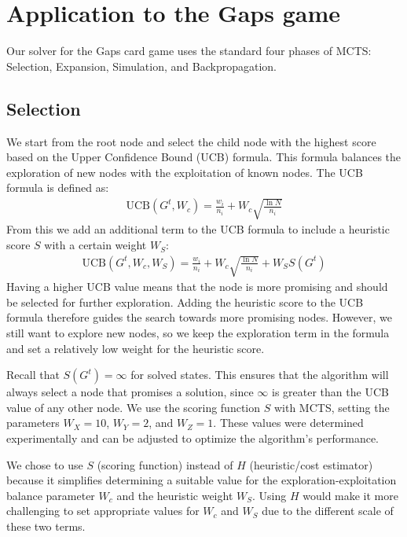 
\section{Application to the Gaps game}
Our solver for the Gaps card game uses the standard four phases of MCTS: Selection, Expansion, Simulation, and Backpropagation.

\subsection{Selection}
We start from the root node and select the child node with the highest score based on the Upper Confidence Bound (UCB) formula. This formula balances the exploration of new nodes with the exploitation of known nodes. The UCB formula is defined as:
\begin{align*}
    \text{UCB}(G^t, W_c) = \frac{w_i}{n_i} + W_c \sqrt{\frac{\ln{N}}{n_i}}
\end{align*}
From this we add an additional term to the UCB formula to include a heuristic score $S$ with a certain weight $W_S$:
\begin{align*}
    \text{UCB}(G^t, W_c, W_S) = \frac{w_i}{n_i} + W_c \sqrt{\frac{\ln{N}}{n_i}} + W_SS(G^t)
\end{align*}
Having a higher UCB value means that the node is more promising and should be selected for further exploration. Adding the heuristic score to the UCB formula therefore guides the search towards more promising nodes. However, we still want to explore new nodes, so we keep the exploration term in the formula and set a relatively low weight for the heuristic score.

 Recall that $S(G^t) = \infty$ for solved states. This ensures that the algorithm will always select a node that promises a solution, since $\infty$ is greater than the UCB value of any other node. We use the scoring function $S$ with MCTS, setting the parameters $W_X = 10$, $W_Y = 2$, and $W_Z = 1$. These values were determined experimentally and can be adjusted to optimize the algorithm's performance.
 
 We chose to use $S$ (scoring function) instead of $H$ (heuristic/cost estimator) because it simplifies determining a suitable value for the exploration-exploitation balance parameter $W_c$ and the heuristic weight $W_S$. Using $H$ would make it more challenging to set appropriate values for $W_c$ and $W_S$ due to the different scale of these two terms.

